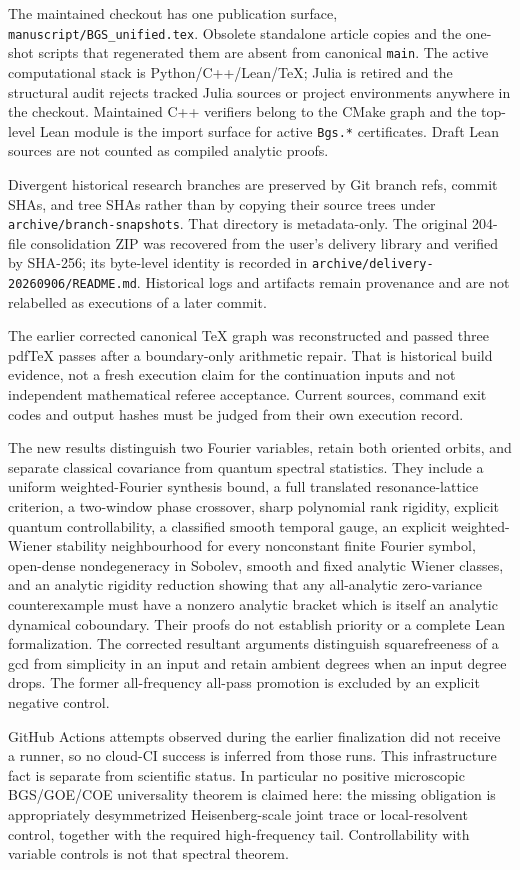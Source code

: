The maintained checkout has one publication surface,
\texttt{manuscript/BGS\_unified.tex}. Obsolete standalone article copies and
the one-shot scripts that regenerated them are absent from canonical
\texttt{main}. The active computational stack is Python/C++/Lean/TeX; Julia is
retired and the structural audit rejects tracked Julia sources or project
environments anywhere in the checkout. Maintained C++ verifiers belong to
the CMake graph and the top-level Lean module is the import surface for
active \texttt{Bgs.*} certificates. Draft Lean sources are not counted as
compiled analytic proofs.

Divergent historical research branches are preserved by Git branch refs,
commit SHAs, and tree SHAs rather than by copying their source trees under
\texttt{archive/branch-snapshots}. That directory is metadata-only. The
original 204-file consolidation ZIP was recovered from the user's delivery
library and verified by SHA-256; its byte-level identity is recorded in
\texttt{archive/delivery-20260906/README.md}. Historical logs and artifacts
remain provenance and are not relabelled as executions of a later commit.

The earlier corrected canonical TeX graph was reconstructed and passed three
pdfTeX passes after a boundary-only arithmetic repair. That is historical
build evidence, not a fresh execution claim for the continuation inputs and
not independent mathematical referee acceptance. Current sources, command
exit codes and output hashes must be judged from their own execution record.

The new results distinguish two Fourier variables, retain both oriented
orbits, and separate classical covariance from quantum spectral statistics.
They include a uniform weighted-Fourier synthesis bound, a full translated
resonance-lattice criterion, a two-window phase crossover, sharp polynomial
rank rigidity, explicit quantum controllability, a classified smooth
temporal gauge, an explicit weighted-Wiener stability neighbourhood for every
nonconstant finite Fourier symbol, open-dense nondegeneracy in Sobolev,
smooth and fixed analytic Wiener classes, and an analytic rigidity reduction
showing that any all-analytic zero-variance counterexample must have a nonzero
analytic bracket which is itself an analytic dynamical coboundary. Their
proofs do not establish priority or a complete Lean formalization. The
corrected resultant arguments distinguish squarefreeness of a gcd from
simplicity in an input and retain ambient degrees when an input degree drops.
The former all-frequency all-pass promotion is excluded by an explicit
negative control.

GitHub Actions attempts observed during the earlier finalization did not
receive a runner, so no cloud-CI success is inferred from those runs. This
infrastructure fact is separate from scientific status. In particular no
positive microscopic BGS/GOE/COE universality theorem is claimed here: the
missing obligation is appropriately desymmetrized Heisenberg-scale joint
trace or local-resolvent control, together with the required high-frequency
tail. Controllability with variable controls is not that spectral theorem.

